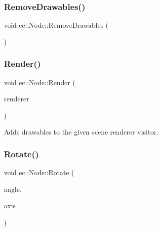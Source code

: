 \mbox{\label{classec_1_1_node_ad874f229d3602ac6f0d0f0ce502a1fbc}} 
\subsubsection{\texorpdfstring{Remove\+Drawables()}{RemoveDrawables()}}
{\footnotesize\ttfamily void ec\+::\+Node\+::\+Remove\+Drawables (\begin{DoxyParamCaption}{ }\end{DoxyParamCaption})}

\mbox{\label{classec_1_1_node_ac606be4f6d5a899a0b9679b6767ff109}} 
\subsubsection{\texorpdfstring{Render()}{Render()}}
{\footnotesize\ttfamily void ec\+::\+Node\+::\+Render (\begin{DoxyParamCaption}\item[{\mbox{\hyperlink{classec_1_1_scene_renderer}{Scene\+Renderer}} \&}]{renderer }\end{DoxyParamCaption})\hspace{0.3cm}{\ttfamily [virtual]}}

Adds drawables to the given scene renderer visitor. \mbox{\label{classec_1_1_node_a131b4280ff9eba0a9cdf1280e2974fcc}} 
\subsubsection{\texorpdfstring{Rotate()}{Rotate()}}
{\footnotesize\ttfamily void ec\+::\+Node\+::\+Rotate (\begin{DoxyParamCaption}\item[{const float}]{angle,  }\item[{const glm\+::vec3 \&}]{axis }\end{DoxyParamCaption})}

\mbox{\label{classec_1_1_node_acd826d1dcd58f5588b8ea75068ddff67}} 
